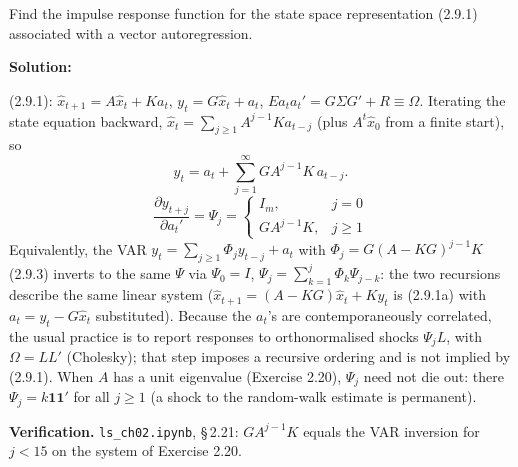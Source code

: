 \documentclass[12pt, letterpaper]{article}
\newcommand{\nb}[1]{\texttt{ls\_ch02.ipynb}, \S\,#1}
\begin{document}
\begin{tcolorbox}[oddbox,title={Exercise 2.21 \quad Impulse Response for a VAR}]
\begin{tcolorbox}[questionbox]
Find the impulse response function for the state space representation (2.9.1) associated with a
vector autoregression.
\end{tcolorbox}

\textbf{Solution:}

(2.9.1): $\hat x_{t+1}=A\hat x_t+Ka_t$, $y_t=G\hat x_t+a_t$, $Ea_ta_t'=G\Sigma G'+R\equiv\Omega$. Iterating
the state equation backward, $\hat x_t=\sum_{j\ge1}A^{j-1}Ka_{t-j}$ (plus $A^t\hat x_0$ from a finite
start), so
\[
y_t=a_t+\sum_{j=1}^\infty GA^{j-1}K\,a_{t-j}.
\]
\[
\boxed{\frac{\partial y_{t+j}}{\partial a_t'}=\Psi_j=\begin{cases}I_m,&j=0\\ GA^{j-1}K,&j\ge1\end{cases}}
\]
Equivalently, the VAR $y_t=\sum_{j\ge1}\Phi_jy_{t-j}+a_t$ with $\Phi_j=G(A-KG)^{j-1}K$ (2.9.3) inverts to
the same $\Psi$ via $\Psi_0=I$, $\Psi_j=\sum_{k=1}^j\Phi_k\Psi_{j-k}$: the two recursions describe the
same linear system ($\hat x_{t+1}=(A-KG)\hat x_t+Ky_t$ is (2.9.1a) with $a_t=y_t-G\hat x_t$
substituted). Because the $a_t$'s are contemporaneously correlated, the usual practice is to report
responses to orthonormalised shocks $\Psi_jL$, with $\Omega=LL'$ (Cholesky); that step imposes a
recursive ordering and is not implied by (2.9.1). When $A$ has a unit eigenvalue (Exercise 2.20),
$\Psi_j$ need not die out: there $\Psi_j=k\mathbf 1\mathbf 1'$ for all $j\ge1$ (a shock to the
random-walk estimate is permanent).

\textbf{Verification.} \nb{2.21}: $GA^{j-1}K$ equals the VAR inversion for $j<15$ on the system of
Exercise 2.20. \checkmark
\end{tcolorbox}
\end{document}
